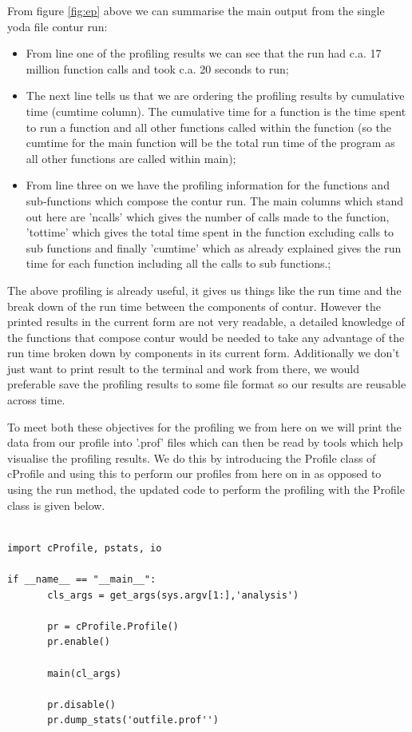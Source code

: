 From figure \ref{fig:ep} above we can summarise the main output from the single yoda file contur run:

\begin{itemize}
\item From line one of the profiling results we can see that the run had c.a. 17 million function calls and took c.a. 20 seconds to run;
\item The next line tells us that we are ordering the profiling results by cumulative time (cumtime column). The cumulative time for a function is the time spent to run a function and all other functions called within the function (so the cumtime for the main function will be the total run time of the program as all other functions are called within main);
\item From line three on we have the profiling information for the functions and sub-functions which compose the contur run. The main columns which stand out here are 'ncalls' which gives the number of calls made to the function, 'tottime' which gives the total time spent in the function excluding calls to sub functions and finally 'cumtime' which as already explained gives the run time for each function including all the calls to sub functions.;
\end{itemize}

The above profiling is already useful, it gives us things like the run time and the break down of the run time between the components of contur. However the printed results in the current form are not very readable, a detailed knowledge of the functions that compose contur would be needed to take any advantage of the run time broken down by components in its current form. Additionally we don't just want to print result to the terminal and work from there, we would preferable save the profiling results to some file format so our results are reusable across time. 

To meet both these objectives for the profiling we  from here on we will print the data from our profile into '.prof' files which can then be read by tools which help visualise the profiling results. We do this by introducing the Profile class of cProfile and using this to perform our profiles from here on in as opposed to using the run method, the updated code to perform the profiling with the Profile class is given below.

\begin{verbatim}

import cProfile, pstats, io

if __name__ == "__main__":
       cls_args = get_args(sys.argv[1:],'analysis')
       
       pr = cProfile.Profile()
       pr.enable()
       
       main(cl_args)
       
       pr.disable()
       pr.dump_stats('outfile.prof'')
\end{verbatim}


